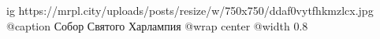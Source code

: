  
 
 
 
 

\ifcmt
  ig https://mrpl.city/uploads/posts/resize/w/750x750/ddaf0vytfhkmzlcx.jpg
	@caption Собор Святого Харлампия
  @wrap center
  @width 0.8
\fi
